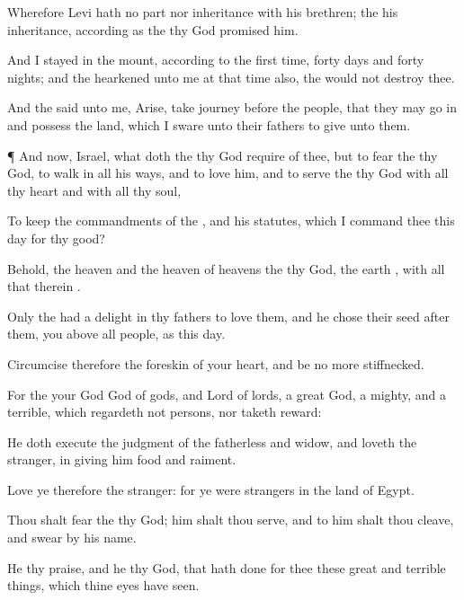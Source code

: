 {Wherefore
Levi hath no
part nor
inheritance with his
brethren; the
{}
{} his
inheritance, according as the
{} thy
God
promised him.

And I
stayed in the
mount, according to the
first
time,
forty
days and
forty
nights; and the
{}
hearkened unto me at that
time also,
{} the
{}
would not
destroy thee.

And the
{}
said unto me,
Arise,
take
{}
journey
before the
people, that they may go
in and
possess the
land, which I
sware unto their
fathers to
give unto them.


\par }{\PP {}¶ And now,
Israel, what doth the
{} thy
God
require of thee, but to
fear the
{} thy
God, to
walk in all his
ways, and to
love him, and to
serve the
{} thy
God with all thy
heart and with all thy
soul,

To
keep the
commandments of the
{}, and his
statutes, which I
command thee this
day for thy
good?

Behold, the
heaven and the
heaven of
heavens
{} the
{} thy
God, the
earth
{}, with all that therein
{}.

Only the
{} had a
delight in thy
fathers to
love them, and he
chose their
seed
after them,
{} you above all
people, as
{} this
day.

Circumcise therefore the
foreskin of your
heart, and be no more
stiffnecked.

For the
{} your
God
{}
God of
gods, and
Lord of
lords, a
great
God, a
mighty, and a
terrible, which
regardeth not
persons, nor
taketh
reward:

He doth
execute the
judgment of the
fatherless and
widow, and
loveth the
stranger, in
giving him
food and
raiment.

Love ye therefore the
stranger: for ye were
strangers in the
land of
Egypt.

Thou shalt
fear the
{} thy
God; him shalt thou
serve, and to him shalt thou
cleave, and
swear by his
name.

He
{} thy
praise, and he
{} thy
God, that hath
done for thee these
great and terrible
things, which thine
eyes have
seen.

}
